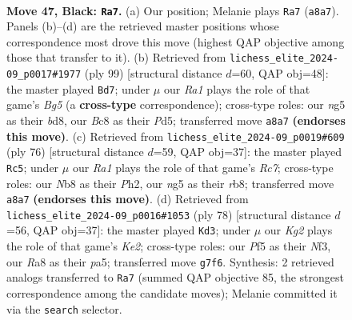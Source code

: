 \documentclass[11pt]{article}
\begin{document}
\clearpage

\begin{figure}[p]\centering
\begin{subfigure}{0.46\textwidth}\centering
\resizebox{\linewidth}{!}{%
\newchessgame
\chessboard[
  setfen={rnb5/1p2n1k1/4p3/5pNB/PpN2P2/1P4P1/5K1P/7R b - - 2 47},
  showmover=false,
  pgfstyle=straightmove, color=movearrow, markmove={a8-a7}
]}
\caption{}
\end{subfigure}\hfill
\begin{subfigure}{0.46\textwidth}\centering
\resizebox{\linewidth}{!}{%
\newchessgame
\chessboard[
  setfen={3B4/5k2/1p3pp1/1P1p3p/2nN2bP/4P1P1/5P2/6K1 b - - 3 50},
  showmover=false,
  pgfstyle=straightmove, color=movearrow, markmove={g4-d7}
]}
\caption{}
\end{subfigure}
\\[4pt]
\begin{subfigure}{0.46\textwidth}\centering
\resizebox{\linewidth}{!}{%
\newchessgame
\chessboard[
  setfen={1r4k1/2R2p1p/3np1p1/1P1p4/5P2/1P2K3/6PP/5B2 w - - 7 39},
  showmover=false,
  pgfstyle=straightmove, color=movearrow, markmove={c7-c5}
]}
\caption{}
\end{subfigure}\hfill
\begin{subfigure}{0.46\textwidth}\centering
\resizebox{\linewidth}{!}{%
\newchessgame
\chessboard[
  setfen={8/3k1p2/n1n1p1p1/p2pP3/3P2P1/5NP1/1B2K3/8 w - - 2 40},
  showmover=false,
  pgfstyle=straightmove, color=movearrow, markmove={e2-d3}
]}
\caption{}
\end{subfigure}
\caption{\textbf{Move 47, Black: \texttt{Ra7}.} (a) Our position; Melanie plays \texttt{Ra7} (\texttt{a8a7}). Panels (b)--(d) are the retrieved master positions whose correspondence most drove this move (highest QAP objective among those that transfer to it). (b) Retrieved from \texttt{lichess\_elite\_2024-09\_p0017\#1977} (ply 99) [structural distance $d$=60, QAP obj=48]: the master played \texttt{Bd7}; under $\mu$ our \emph{Ra1} plays the role of that game's \emph{Bg5} (a \textbf{cross-type} correspondence); cross-type roles: our \emph{n}g5 as their \emph{b}d8, our \emph{B}c8 as their \emph{P}d5; transferred move \texttt{a8a7} \textbf{(endorses this move)}. (c) Retrieved from \texttt{lichess\_elite\_2024-09\_p0019\#609} (ply 76) [structural distance $d$=59, QAP obj=37]: the master played \texttt{Rc5}; under $\mu$ our \emph{Ra1} plays the role of that game's \emph{Rc7}; cross-type roles: our \emph{N}b8 as their \emph{P}h2, our \emph{n}g5 as their \emph{r}b8; transferred move \texttt{a8a7} \textbf{(endorses this move)}. (d) Retrieved from \texttt{lichess\_elite\_2024-09\_p0016\#1053} (ply 78) [structural distance $d$=56, QAP obj=37]: the master played \texttt{Kd3}; under $\mu$ our \emph{Kg2} plays the role of that game's \emph{Ke2}; cross-type roles: our \emph{P}f5 as their \emph{N}f3, our \emph{R}a8 as their \emph{p}a5; transferred move \texttt{g7f6}. Synthesis: 2 retrieved analogs transferred to \texttt{Ra7} (summed QAP objective 85, the strongest correspondence among the candidate moves); Melanie committed it via the \texttt{search} selector.}
\label{fig:thought-m93}
\end{figure}
\end{document}
